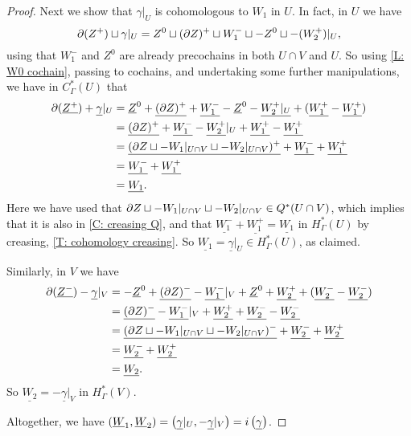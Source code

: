 \begin{proof}
	Next we show that $\gamma|_U$ is cohomologous to $W_1$ in $U$.
	In fact, in $U$ we have
	\[\partial (Z^+) \sqcup \gamma|_U = Z^0 \sqcup (\partial Z)^+ \sqcup W_1^- \sqcup -Z^0 \sqcup -(W_2^+)|_U,\]
	using that $W_1^-$ and $Z^0$ are already precochains in both $U \cap V$ and $U$.
	So using \cref{L: W0 cochain}, passing to cochains, and undertaking some further manipulations, we have in $C^*_\Gamma(U)$ that
	\begin{align*}
	\partial (\underline{Z^+}) + \underline{\gamma}|_U &
		= \underline Z^0 + \underline{(\partial Z)^+} + \underline{W_1^-} - \underline Z^0 -\underline{W_2^+|_U} + (\underline{W_1^+} - \underline{W_1^+})\\
		&= \underline{(\partial Z)^+} + \underline{W_1^-}  -\underline{W_2^+}|_U + \underline{W_1^+} - \underline{W_1^+}\\
		&= \underline{(\partial Z \sqcup - W_1|_{U \cap V} \sqcup - W_2|_{U \cap V})^+}  + \underline{W_1^-}   + \underline{W_1^+}\\
		&=\underline{W_1^-}   + \underline{W_1^+}\\
		&=\underline{W_1}.
	\end{align*}
	Here we have used that $\partial Z \sqcup - W_1|_{U \cap V} \sqcup - W_2|_{U \cap V} \in Q^*(U \cap V)$, which implies that it is also in \cref{C: creasing Q},
	and that $\underline{W_1^-}   + \underline{W_1^+}= \underline{W_1}$ in $H^*_\Gamma(U)$ by creasing, \cref{T: cohomology creasing}.
	So $\underline{W_1} = \underline{\gamma}|_U \in H^*_\Gamma(U)$, as claimed.

	Similarly, in $V$ we have
	\begin{align*}
	\partial (\underline{Z^-}) - \underline{\gamma}|_V &
		= - \underline Z^0 + \underline{(\partial Z)^-} - \underline{W_1^-}|_V + \underline Z^0 +\underline{W_2^+} + (\underline{W_2^-} - \underline{W_2^-})\\
		&= \underline{(\partial Z)^-} - \underline{W_1^-}|_V  + \underline{W_2^+} + \underline{W_2^-} - \underline{W_2^-}\\
		&= \underline{(\partial Z \sqcup - W_1|_{U \cap V} \sqcup - W_2|_{U \cap V})^-}  + \underline{W_2^-}   + \underline{W_2^+}\\
		&=\underline{W_2^-}   + \underline{W_2^+}\\
		&=\underline{W_2}.
	\end{align*}
	So $\underline{W_2} = -\underline{\gamma}|_V$ in $H^*_\Gamma(V)$.


	Altogether, we have $(\underline{W}_1,\underline{W}_2) = \left(\underline{\gamma}|_U, -\underline{\gamma}|_V\right) = i\left(\underline{\gamma}\right)$.


\end{proof}
